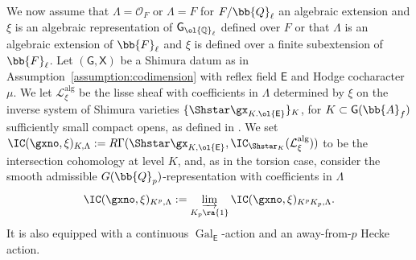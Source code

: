 \documentclass[letterpaper,11pt]{amsart}
\begin{document}
We now assume that $\Lambda = \mathcal{O}_F$ or $\Lambda = F$ for $F/\bb{Q}_{\ell}$ an algebraic extension and $\xi$ is an algebraic representation of $\mathsf{G}_{\ol{\mathbb{Q}}_{\ell}}$ defined over $F$ or that $\Lambda$ is an algebraic extension of $\bb{F}_{\ell}$ and $\xi$ is defined over a finite subextension of $\bb{F}_{\ell}$. Let $(\mathsf{G},\mathsf{X})$ be a Shimura datum as in Assumption~\ref{assumption:codimension} with reflex field $\mathsf{E}$ and Hodge cocharacter $\mu$. We let $\mathcal{L}^{\mathrm{alg}}_{\xi}$ be the lisse sheaf with coefficients in $\Lambda$ determined by $\xi$ on the inverse system of Shimura varieties $\{\Shstar\gx_{K.\ol{\mathsf{E}}}\}_K$, for $K \subset \mathsf{G}(\bb{A}_{f})$ sufficiently small compact opens, as defined in \cite[Section~5.1]{PinkHigherDirectImages}. We set $\IC(\gxno,\xi)_{K,\Lambda} := R\Gamma(\Shstar\gx_{K,\ol{\mathsf{E}}},\IC_{\Shstar_{K}}(\mathcal{L}_{\xi}^{\mathrm{alg}}))$ to be the intersection cohomology at level $K$, and, as in the torsion case, consider the smooth admissible $G(\bb{Q}_{p})$-representation with coefficients in $\Lambda$
\begin{equation}{\label{eqn: IntersectionComplexAtInfiniteLevel}}
\IC(\gxno,\xi)_{K^{p},\Lambda}:= \varinjlim_{K_{p} \ra \{1\}} \IC(\gxno,\xi)_{K^{p}K_{p},\Lambda}.
\end{equation}
It is also equipped with a continuous $\operatorname{Gal}_{\mathsf{E}}$-action and an away-from-$p$ Hecke action. 
\end{document}
